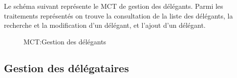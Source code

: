 \documentclass[a4paper]{report}
\begin{document}
\begin{doublespace}
	Le schéma suivant représente le MCT de gestion des délégants. Parmi les traitements représentés
	on trouve la consultation de la liste des délégants, la recherche et la modification d'un délégant,
	et l'ajout d'un délégant.
	\begin{figure}[H]
		\begin{center}
			\caption{MCT:Gestion des délégants}
		\end{center}
	\end{figure}

	\subsection{Gestion des délégataires}


\end{doublespace}
\end{document}
